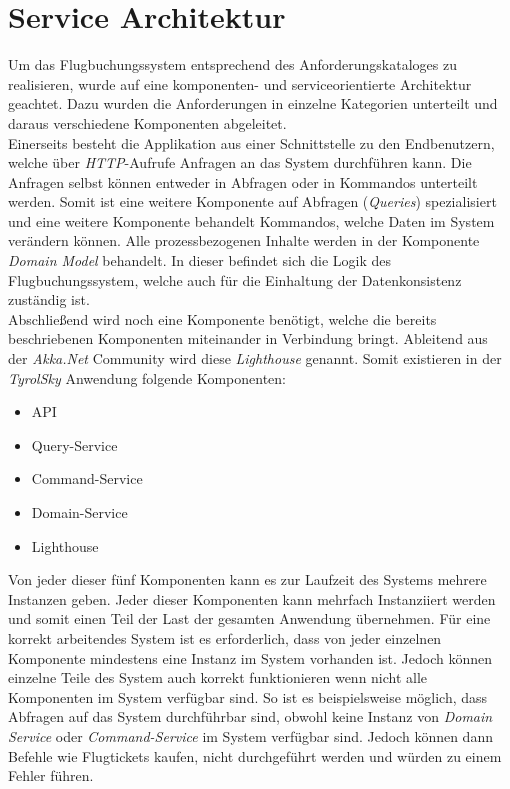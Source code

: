 \section{Service Architektur}
\label{sec:implementation:serviceAndComponentOrientation}
Um das Flugbuchungssystem entsprechend des Anforderungskataloges zu realisieren, wurde auf eine komponenten- und serviceorientierte Architektur geachtet. Dazu wurden die Anforderungen in einzelne Kategorien unterteilt und daraus verschiedene Komponenten abgeleitet. \\
Einerseits besteht die Applikation aus einer Schnittstelle zu den Endbenutzern, welche über \textit{HTTP}-Aufrufe Anfragen an das System durchführen kann. Die Anfragen selbst können entweder in Abfragen oder in Kommandos unterteilt werden. Somit ist eine weitere Komponente auf Abfragen (\textit{Queries}) spezialisiert und eine weitere Komponente behandelt Kommandos, welche Daten im System verändern können. Alle prozessbezogenen Inhalte werden in der Komponente \textit{Domain Model} behandelt. In dieser befindet sich die Logik des Flugbuchungssystem, welche auch für die Einhaltung der Datenkonsistenz zuständig ist. \\
% 
% 
Abschließend wird noch eine Komponente benötigt, welche die bereits beschriebenen Komponenten miteinander in Verbindung bringt. Ableitend aus der \textit{Akka.Net} Community wird diese \textit{Lighthouse} genannt. Somit existieren in der \textit{TyrolSky} Anwendung folgende Komponenten:
\begin{itemize}
    \item API
    \item Query-Service
    \item Command-Service
    \item Domain-Service
    \item Lighthouse
\end{itemize}
Von jeder dieser fünf Komponenten kann es zur Laufzeit des Systems mehrere Instanzen  geben. 
Jeder dieser Komponenten kann mehrfach Instanziiert werden und somit einen Teil der Last der gesamten Anwendung übernehmen. Für eine korrekt arbeitendes System ist es erforderlich, dass von jeder einzelnen Komponente mindestens eine Instanz im System vorhanden ist. Jedoch können einzelne Teile des System auch korrekt funktionieren wenn nicht alle Komponenten im System verfügbar sind. So ist es beispielsweise möglich, dass Abfragen auf das System durchführbar sind, obwohl keine Instanz von \textit{Domain Service} oder \textit{Command-Service} im System verfügbar sind. Jedoch können dann Befehle wie Flugtickets kaufen, nicht durchgeführt werden und würden zu einem Fehler führen. \\
